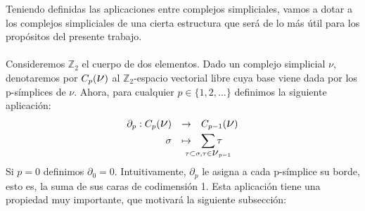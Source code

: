 \documentclass[12pt]{article}
\numberwithin{equation}{section}
\theoremstyle{definition}
\theoremstyle{remark}
\theoremstyle{plain}
\begin{document}
	Teniendo definidas las aplicaciones entre complejos simpliciales, 
	vamos a dotar a los complejos simpliciales de una cierta estructura 
	que será de lo más útil para los propósitos del presente trabajo.\\
	\\
	Consideremos $\mathbb{Z}_{2}$ el cuerpo de dos elementos. Dado un 
	complejo simplicial {\Large $\nu$}, denotaremos por 
	$C_{p}(\text{{\Large $\nu$}})$ al $\mathbb{Z}_{2}$-espacio vectorial
	libre cuya base viene dada por los p-símplices de {\Large $\nu$}. 
	Ahora, para cualquier $p \in \{1,2,...\}$ definimos la siguiente 
	aplicación: 
	\begin{equation}
		\label{def:borde}
		\begin{array}{lll}
			\partial_{p}:C_{p}(\text{{\Large $\nu$}}) & 
				\rightarrow & C_{p-1}(\text{{\Large $\nu$}})
				\\[3pt] 
			\multicolumn{1}{r}{\sigma} & \mapsto & \displaystyle 
				\sum_{\mathclap{\tau \subset \sigma,\tau \in 
				\text{{\large $\nu$}}_{p-1}}}\tau
		\end{array} 
	\end{equation}
	Si $p=0$ definimos $\partial_{0}=0$. Intuitivamente, $\partial_{p}$ le
	asigna a cada p-símplice su borde, esto es, la suma de sus caras de
	codimensión 1. Esta aplicación tiene una propiedad muy importante, 
	que motivará la siguiente subsección:
\end{document}
